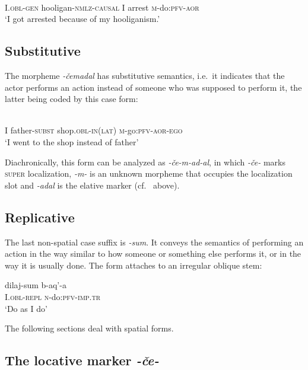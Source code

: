 ﻿\documentclass[output=paper]{langsci/langscibook}
\begin{document}
\ex \label{ex:3:26}
\\
I.\textsc{obl}-\textsc{gen} hooligan-\textsc{nmlz}-\textsc{causal} I arrest \textsc{m}-do:\textsc{pfv}-\textsc{aor}\\
\glt `I got arrested because of my hooliganism.'

\z

\subsection{Substitutive}\label{substitutive}

The morpheme \emph{-čemadal} has substitutive semantics, i.e.\ it
indicates that the actor performs an action instead of someone who was
supposed to perform it, the latter being coded by this case form:

\ea
{}\\
I father-\textsc{subst} shop.\textsc{obl}-\textsc{in}(\textsc{lat}) \textsc{m}-go:\textsc{pfv}-\textsc{aor}-\textsc{ego}\\
\glt `I went to the shop instead of father'
\z

Diachronically, this form can be analyzed as \emph{-če-m-ad-al}, in
which \emph{-če-} marks \textsc{super} localization, \emph{-m-} is an
unknown morpheme that occupies the localization slot and \emph{-adal}
is the elative marker (cf.\  above).

\subsection{Replicative}\label{replicative}

The last non-spatial case suffix is \emph{-sum}. It conveys the
semantics of performing an action in the way similar to how someone or
something else performs it, or in the way it is usually done. The form
attaches to an irregular oblique stem:

\ea
\gll dilaj-sum b-aq'-a\\
I.\textsc{obl}-\textsc{repl} \textsc{n}-do:\textsc{pfv}-\textsc{imp}.\textsc{tr}\\
\glt `Do as I do'
\z

The following sections deal with spatial forms.

\subsection{The locative marker \emph{-če-}}\label{the-locative-marker-ce}
\end{document}
